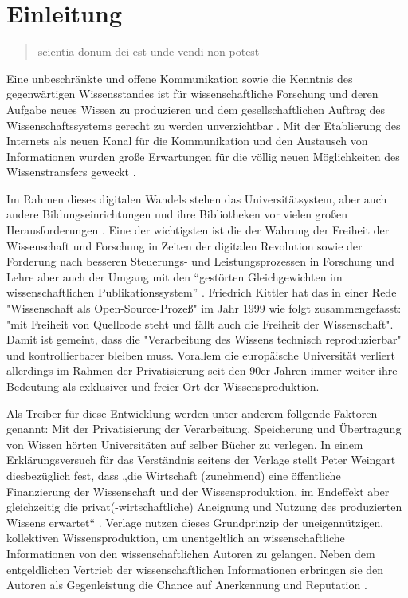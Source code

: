 \chapter{Einleitung} 

\begin{quote}
scientia donum dei est unde vendi non potest
\end{quote}Eine unbeschränkte und offene Kommunikation sowie die Kenntnis des gegenwärtigen Wissensstandes ist für wissenschaftliche Forschung und deren Aufgabe neues Wissen zu produzieren und dem gesellschaftlichen Auftrag des Wissenschaftssystems gerecht zu werden unverzichtbar \cite{Hanekop_2014} \cite{glaeser2006} \cite{gibbons_1994} \cite{Luhmann1998}. Mit der Etablierung des Internets als neuen Kanal für die Kommunikation und den Austausch von Informationen wurden große Erwartungen für die völlig neuen Möglichkeiten des Wissenstransfers geweckt \cite{Hanekop_2014} \cite{albert_2006_open_implications} \cite{Goodrum_2001} \cite{Lawrence_1999}. 

Im Rahmen dieses digitalen Wandels stehen das Universitätsystem, aber auch andere Bildungseinrichtungen und ihre Bibliotheken vor vielen großen Herausforderungen \cite{Harter2006} \cite{Gu_don_2004} \cite{osterloh2008anreize}. Eine der wichtigsten ist die der Wahrung der Freiheit der Wissenschaft und Forschung in Zeiten der digitalen Revolution sowie der Forderung nach besseren Steuerungs- und Leistungsprozessen in Forschung und Lehre \cite{Adler_2009} \cite{gibbons_1994} aber auch der Umgang mit den “gestörten Gleichgewichten im wissenschaftlichen Publikationssystem” \cite{cite:0}. Friedrich Kittler hat das in einer Rede "Wissenschaft als Open-Source-Prozeß" im Jahr 1999 wie folgt zusammengefasst: "mit Freiheit von Quellcode steht und fällt auch die Freiheit der Wissenschaft". Damit ist gemeint, dass die "Verarbeitung des Wissens technisch reproduzierbar" \cite{cite:1} und kontrollierbarer bleiben muss. Vorallem die europäische Universität verliert allerdings im Rahmen der Privatisierung seit den 90er Jahren immer weiter ihre Bedeutung als exklusiver und freier Ort der Wissensproduktion.

Als Treiber für diese Entwicklung werden unter anderem follgende Faktoren genannt:
Mit der Privatisierung der Verarbeitung, Speicherung und Übertragung von Wissen hörten Universitäten auf selber Bücher zu verlegen. In einem Erklärungsversuch für das Verständnis seitens der Verlage stellt Peter Weingart diesbezüglich fest, dass „die Wirtschaft (zunehmend) eine öffentliche Finanzierung der Wissenschaft und der Wissensproduktion, im Endeffekt aber gleichzeitig die privat(-wirtschaftliche) Aneignung und Nutzung des produzierten Wissens erwartet“ \cite{cite:2}. Verlage nutzen dieses Grundprinzip der uneigennützigen, kollektiven Wissensproduktion, um unentgeltlich an wissenschaftliche Informationen von den wissenschaftlichen Autoren zu gelangen. Neben dem entgeldlichen Vertrieb der wissenschaftlichen Informationen erbringen sie den Autoren als Gegenleistung die Chance auf Anerkennung und Reputation \cite{cite:21a}. 

